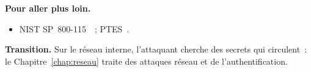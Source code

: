 \bigskip

\begin{boxinfo}
\textbf{Pour aller plus loin.}
\begin{itemize}
    \item NIST SP~800-115~\cite{nist800115}~; PTES~\cite{ptes}.
\end{itemize}
\end{boxinfo}

\begin{boxinfo}
\textbf{Transition.} Sur le réseau interne, l'attaquant cherche des secrets
qui circulent~: le Chapitre~\ref{chap:reseau} traite des attaques réseau et
de l'authentification.
\end{boxinfo}
